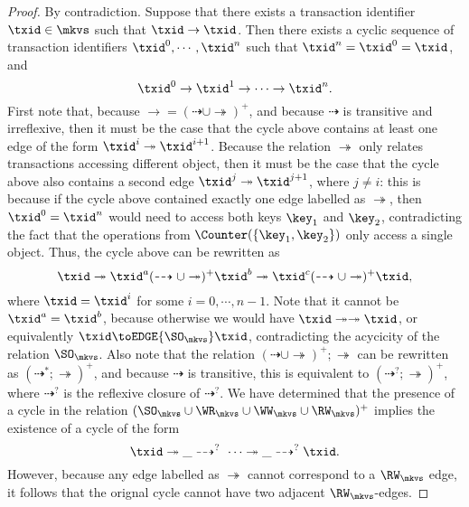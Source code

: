 \begin{proof}
By contradiction. Suppose that there exists a transaction identifier $\txid \in \mkvs$ such that 
$\txid \rightarrow \txid$. Then there exists a cyclic sequence of transaction identifiers 
$\txid^{0}, \cdots, \txid^{n}$ such that $\txid^{n} =  \txid^{0} = \txid$, and
\[ 
\txid^{0} \rightarrow \txid^{1} \rightarrow \cdots \rightarrow \txid^{n}.
\]
First note that, because $\rightarrow = (\dashrightarrow \cup \twoheadrightarrow)^{+}$, 
and because $\dashrightarrow$ is transitive and irreflexive, then it must be the 
case that the cycle above contains at least one edge of the form $\txid^{i} \twoheadrightarrow \txid^{i+1}$. 
Because the relation $\twoheadrightarrow$ only relates transactions accessing different object, 
then it must be the case that the cycle above also contains a second edge $\txid^{j} \twoheadrightarrow \txid^{j+1}$, 
where $j \neq i$: this is because if the cycle above contained exactly one edge labelled as $\twoheadrightarrow$, 
then $\txid^{0} = \txid^{n}$ would need to access both keys $\key_1$ and $\key_2$, contradicting the 
fact that the operations from $\Counter(\{\key_1, \key_2\})$ only access a single object. 
Thus, the cycle above can be rewritten as 
\[ 
\txid \twoheadrightarrow \txid^{a} (\dashrightarrow \cup \twoheadrightarrow)^{+} \txid^{b} \twoheadrightarrow  \txid^{c} (\dashrightarrow \cup \twoheadrightarrow)^{+} \txid, 
\]
where $\txid = \txid^{i}$ for some $i=0,\cdots, n-1$. Note that it cannot be $\txid^{a} = \txid^{b}$, because 
otherwise we would have $\txid \twoheadrightarrow \twoheadrightarrow \txid$, or equivalently 
$\txid \toEDGE{\SO_{\mkvs}} \txid$, contradicting the acycicity of the relation $\SO_{\mkvs}$. 
Also note that the relation $(\dashrightarrow \cup \twoheadrightarrow)^{+} ; \twoheadrightarrow$ can be rewritten as 
$(\dashrightarrow^{*} ; \twoheadrightarrow)^{+}$, and because $\dashrightarrow$ is transitive, 
this is equivalent to $(\dashrightarrow^{?} ; \twoheadrightarrow)^{+}$, where $\dashrightarrow^{?}$ is 
the reflexive closure of $\dashrightarrow^{?}$. 
We have determined that the presence of a cycle in the relation $(\SO_{\mkvs} \cup \WR_{\mkvs} \cup \WW_{\mkvs} \cup \RW_{\mkvs})^{+}$ 
implies the existence of a cycle of the form 
\[
\txid \twoheadrightarrow \_ \dashrightarrow^{?} \ \cdots \twoheadrightarrow \_ \dashrightarrow^{?} \txid.
\]
However, because any edge labelled as $\twoheadrightarrow$ cannot correspond to a $\RW_{\mkvs}$ edge, 
it follows that the orignal cycle cannot have two adjacent $\RW_{\mkvs}$-edges. 
%

\end{proof}
